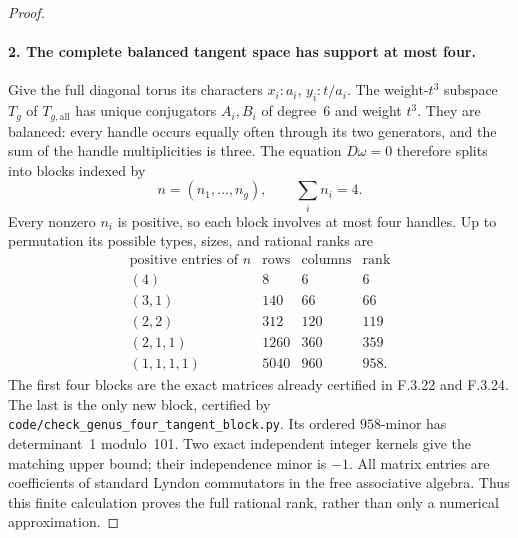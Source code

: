 \begin{proof}
\paragraph{2. The complete balanced tangent space has support at most four.}
Give the full diagonal torus its characters
$x_i:a_i$, $y_i:t/a_i$. The weight-$t^3$ subspace
$T_g$ of $T_{g,\mathrm{all}}$ has unique conjugators
$A_i,B_i$ of degree~6 and weight $t^3$. They are
balanced: every handle occurs equally often through
its two generators, and the sum of the handle
multiplicities is three. The equation $D\omega=0$
therefore splits into blocks indexed by
\[
               n=(n_1,\ldots,n_g),\qquad \sum_i n_i=4.
\]
Every nonzero $n_i$ is positive, so each block involves
at most four handles. Up to permutation its possible
types, sizes, and rational ranks are
\[
\begin{array}{c|r|r|r}
\text{positive entries of }n&\text{rows}&\text{columns}&\text{rank}\\\hline
(4)&8&6&6\\
(3,1)&140&66&66\\
(2,2)&312&120&119\\
(2,1,1)&1260&360&359\\
(1,1,1,1)&5040&960&958.
\end{array}                                               \tag{AG.4}
\]
The first four blocks are the exact matrices already
certified in F.3.22 and F.3.24. The last is the only
new block, certified by
\texttt{code/check\_genus\_four\_tangent\_block.py}.
Its ordered $958$-minor has determinant~1 modulo~101.
Two exact independent integer kernels give the
matching upper bound; their independence minor is
$-1$. All matrix entries are coefficients of standard
Lyndon commutators in the free associative algebra.
Thus this finite calculation proves the full rational
rank, rather than only a numerical approximation.


\end{proof}

